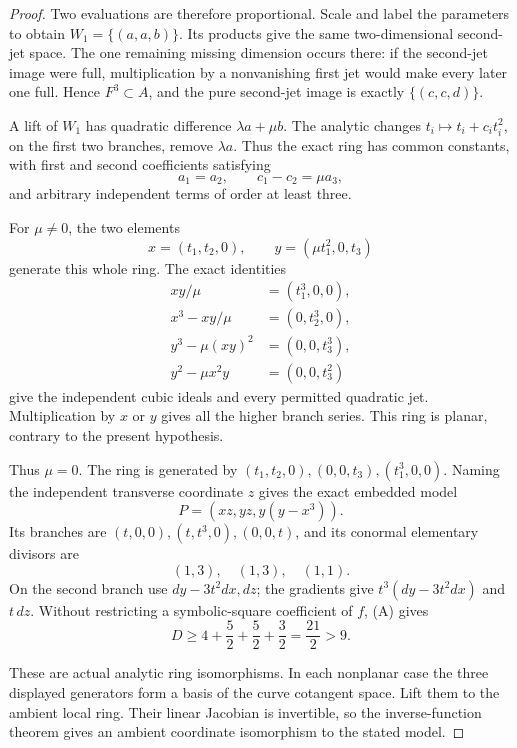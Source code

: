 \begin{proof}
Two evaluations are therefore proportional. Scale and label the parameters to obtain \(W_1=\{(a,a,b)\}\). Its products give the same two-dimensional second-jet space. The one remaining missing dimension occurs there: if the second-jet image were full, multiplication by a nonvanishing first jet would make every later one full. Hence \(F^3\subset A\), and the pure second-jet image is exactly \(\{(c,c,d)\}\).

A lift of \(W_1\) has quadratic difference \(\lambda a+\mu b\). The analytic changes \(t_i\mapsto t_i+c_it_i^2\), on the first two branches, remove \(\lambda a\). Thus the exact ring has common constants, with first and second coefficients satisfying \[
                     a_1=a_2,\qquad c_1-c_2=\mu a_3, \tag{E}
\] and arbitrary independent terms of order at least three.

For \(\mu\ne0\), the two elements \[
 x=(t_1,t_2,0),\qquad y=(\mu t_1^2,0,t_3)
\] generate this whole ring. The exact identities \[
 \begin{aligned}
 xy/\mu&=(t_1^3,0,0),\\
 x^3-xy/\mu&=(0,t_2^3,0),\\
 y^3-\mu(xy)^2&=(0,0,t_3^3),\\
 y^2-\mu x^2y&=(0,0,t_3^2)
 \end{aligned}
\] give the independent cubic ideals and every permitted quadratic jet. Multiplication by \(x\) or \(y\) gives all the higher branch series. This ring is planar, contrary to the present hypothesis.

Thus \(\mu=0\). The ring is generated by \((t_1,t_2,0),(0,0,t_3),(t_1^3,0,0)\). Naming the independent transverse coordinate \(z\) gives the exact embedded model \[
                       P=(xz,yz,y(y-x^3)).            \tag{F}
\] Its branches are \((t,0,0),(t,t^3,0),(0,0,t)\), and its conormal elementary divisors are \[
                         (1,3),\quad(1,3),\quad(1,1).
\] On the second branch use \(dy-3t^2dx,dz\); the gradients give \(t^3(dy-3t^2dx)\) and \(t\,dz\). Without restricting a symbolic-square coefficient of \(f\), (A) gives \[
                  D\ge4+\frac52+\frac52+\frac32
                       =\frac{21}{2}>9.               \tag{G}
\]

These are actual analytic ring isomorphisms. In each nonplanar case the three displayed generators form a basis of the curve cotangent space. Lift them to the ambient local ring. Their linear Jacobian is invertible, so the inverse-function theorem gives an ambient coordinate isomorphism to the stated model.


\end{proof}
